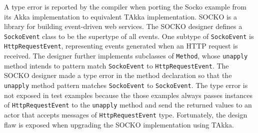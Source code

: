 A type error is reported by the compiler when porting the Socko example 
\citep{SOCKO} from its Akka implementation to equivalent TAkka implementation.
SOCKO is a library for building event-driven web services.  The SOCKO designer
defines a {\tt SockoEvent} class to be the supertype of all events.  One
subtype of {\tt SockoEvent} is {\tt HttpRequestEvent}, representing events
generated when an HTTP request is received. The designer further implements
subclasses of {\tt Method}, whose {\tt unapply} method intends to pattern
match {\tt SockoEvent} to {\tt HttpRequestEvent}.  The SOCKO
designer made a type error in the method declaration so that the {\tt unapply}
method pattern matches {\tt SockoEvent} to {\tt SockoEvent}. The type error is
not exposed in test examples because the those examples always passes instances 
of {\tt HttpRequestEvent} to the {\tt unapply} method and send the returned
values to an actor that accepts messages of {\tt HttpRequestEvent} type.
Fortunately, the design flaw is exposed when upgrading the SOCKO implementation 
using TAkka.




